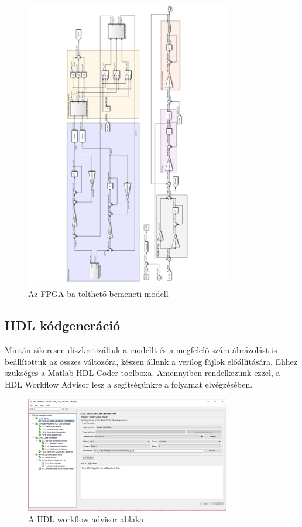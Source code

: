 \begin{figure}[H]
	\centering
	\includegraphics[width = 0.8\textwidth]{figures/hil_model_disc.pdf}
	\caption{Az FPGA-ba tölthető bemeneti modell} 
	\label{fig:floating}
\end{figure}


\subsection{HDL kódgeneráció}

Miután sikeresen diszkretizáltuk a modellt és a megfelelő szám ábrázolást is beállítottuk az összes változóra, készen állunk a verilog fájlok előállítására. Ehhez szükséges a Matlab HDL Coder toolboxa. Amennyiben rendelkezünk ezzel, a HDL Workflow Advisor lesz a segítségünkre a folyamat elvégzésében.

\begin{figure}[h!]
	\centering
	\includegraphics[width = 0.8\textwidth]{figures/hdl_advisor.png}
	\caption{A HDL workflow advisor ablaka} 
	\label{fig:hdl_advisor}
\end{figure}

